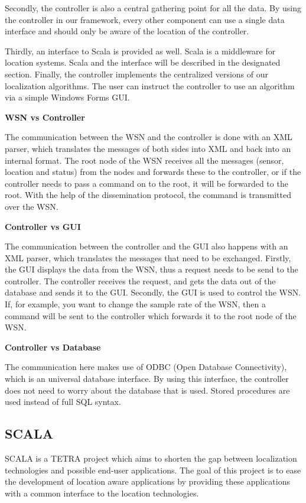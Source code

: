 Secondly, the controller is also a central gathering point for all the data. By using the controller in our framework, every other component can use a single data interface and should only be aware of the location of the controller.

Thirdly, an interface to Scala is provided as well. Scala is a middleware for location systems. Scala and the interface will be described in the designated section.
Finally, the controller implements the centralized versions of our localization algorithms. The user can instruct the controller to use an algorithm via a simple Windows Forms GUI.

\textbf{WSN vs Controller}

The communication between the WSN and the controller is done with an XML parser, which translates the messages of both sides into XML and back into an internal format. The root node of the WSN receives all the messages (sensor, location and status) from the nodes and forwards these to the controller, or if the controller needs to pass a command on to the root, it will be forwarded to the root. With the help of the dissemination protocol, the command is transmitted over the WSN. 

\textbf{Controller vs GUI}

The communication between the controller and the GUI also happens with an XML parser, which translates the messages that need to be exchanged. Firstly, the GUI displays the data from the WSN, thus a request needs to be send to the controller. The controller receives the request, and gets the data out of the database and sends it to the GUI. Secondly, the GUI is used to control the WSN. If, for example, you want to change the sample rate of the WSN, then a command will be sent to the controller which forwards it to the root node of the WSN. 

\textbf{Controller vs Database}

The communication here makes use of ODBC (Open Database Connectivity), which is an universal database interface. By using this interface, the controller does not need to worry about the database that is used. Stored procedures are used instead of full SQL syntax.

\subsection{SCALA}
SCALA is a TETRA \cite{tetra} project which aims to shorten the gap between localization technologies and possible end-user applications. The goal of this project is to ease the development of location aware applications by providing these applications with a common interface to the location technologies.

